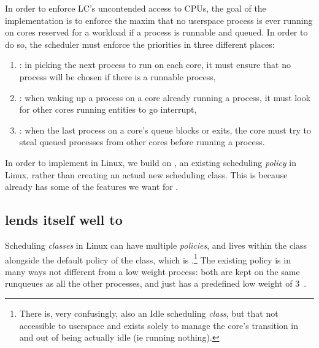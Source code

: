 In order to enforce LC's uncontended access to CPUs, the goal of the
implementation is to enforce the maxim that no \beclass{} userspace process is
ever running on cores reserved for a \normalclass{} workload if a \normalclass{}
process is runnable and queued. In order to do so,
the scheduler must enforce the priorities in three different places:
\begin{enumerate}
    \item \local: in picking the next process to run on each core, it must ensure
        that no \beclass{} process will be chosen if there is a runnable
        \normalclass{} process,
    \item \entry: when waking up a \normalclass{} process on a core already
        running a \normalclass{} process, it must look for other cores running
        \beclass{} entities to go interrupt,
    \item \exit: when the last \normalclass{} process on a core's queue blocks
        or exits, the core must try to steal queued \normalclass{} processes from
        other cores before running a \beclass{} process.
\end{enumerate}

In order to implement \beclass{} in Linux, we build on \schedidle{}, an existing
scheduling \textit{policy} in Linux, rather than creating an actual new
scheduling class. This is because \schedidle{} already has some of the features
we want for \beclass{}.

\subsection{\schedidle{} lends itself well to \beclass{}}

Scheduling \textit{classes} in Linux can have multiple \textit{policies}, and
\schedidle{} lives within the \normalclass{} class alongside the default policy
of the \normalclass{} class, which is \schednormal{}.\footnote{There is, very
confusingly, also an Idle scheduling \textit{class}, but that not accessible to
userspace and exists solely to manage the core's transition in and out of being
actually idle (ie running nothing).} The existing \schedidle{} policy is in many
ways not different from a low weight \schednormal{} process: both are kept on
the same runqueues as all the other \schednormal{} processes, and \schedidle{}
just has a predefined low weight of 3~\cite{weight-idleprio}.

